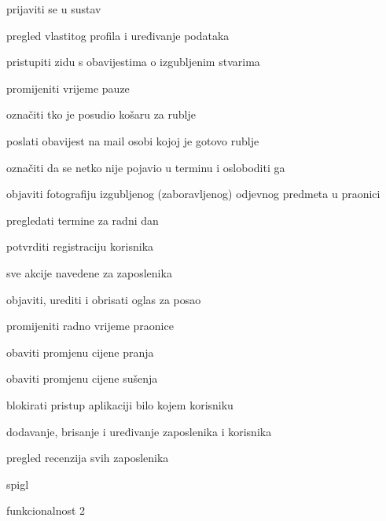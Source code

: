 \begin{packed_enum}
\begin{packed_enum}
	\end{packed_enum}
	
	\item  {}
	
	\begin{packed_enum}
		
		\item prijaviti se u sustav
		\item pregled vlastitog profila i uređivanje podataka
		\item pristupiti zidu s obavijestima o izgubljenim stvarima
		\item promijeniti vrijeme pauze
		\item označiti tko je posudio košaru za rublje
		\item poslati obavijest na mail osobi kojoj je gotovo rublje
		\item označiti da se netko nije pojavio u terminu i osloboditi ga
		\item objaviti fotografiju izgubljenog (zaboravljenog) odjevnog predmeta u praonici
		\item pregledati termine za radni dan
		\item potvrditi registraciju korisnika
		
	\end{packed_enum}
	
	\item  {}
	
	\begin{packed_enum}
		
		\item sve akcije navedene za zaposlenika
		\item objaviti, urediti i obrisati oglas za posao
		\item promijeniti radno vrijeme praonice
		\item obaviti promjenu cijene pranja
		\item obaviti promjenu cijene sušenja
		\item blokirati pristup aplikaciji bilo kojem korisniku
		\item dodavanje, brisanje i uređivanje zaposlenika i korisnika
		\item pregled recenzija svih zaposlenika
		
	\end{packed_enum}
	
	\item  {}
	
	\begin{packed_enum}
		
		\item spigl 
		\item funkcionalnost 2
		
	\end{packed_enum}
	
\end{packed_enum}

